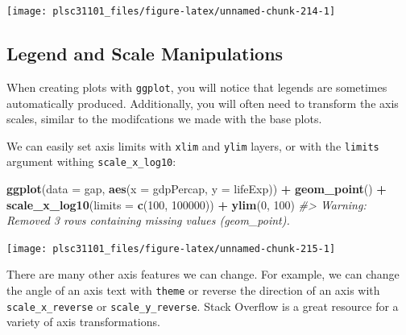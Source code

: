 \documentclass[
]{book}
\newenvironment{Shaded}{\begin{snugshade}}{\end{snugshade}}
\newcommand{\CommentTok}[1]{\textcolor[rgb]{0.56,0.35,0.01}{\textit{#1}}}
\newcommand{\DataTypeTok}[1]{\textcolor[rgb]{0.13,0.29,0.53}{#1}}
\newcommand{\DecValTok}[1]{\textcolor[rgb]{0.00,0.00,0.81}{#1}}
\newcommand{\KeywordTok}[1]{\textcolor[rgb]{0.13,0.29,0.53}{\textbf{#1}}}
\newcommand{\NormalTok}[1]{#1}
\newcommand{\OperatorTok}[1]{\textcolor[rgb]{0.81,0.36,0.00}{\textbf{#1}}}
\newcommand{\StringTok}[1]{\textcolor[rgb]{0.31,0.60,0.02}{#1}}
\begin{document}
\begin{center}\texttt{[image: plsc31101\_files/figure-latex/unnamed-chunk-214-1]} \end{center}

\hypertarget{legend-and-scale-manipulations}{%
\subsection{Legend and Scale Manipulations}\label{legend-and-scale-manipulations}}

When creating plots with \texttt{ggplot}, you will notice that legends are sometimes automatically produced. Additionally, you will often need to transform the axis scales, similar to the modifcations we made with the base plots.

We can easily set axis limits with \texttt{xlim} and \texttt{ylim} layers, or with the \texttt{limits} argument withing \texttt{scale\_x\_log10}:

\begin{Shaded}
\begin{Highlighting}[]
\KeywordTok{ggplot}\NormalTok{(}\DataTypeTok{data =}\NormalTok{ gap, }\KeywordTok{aes}\NormalTok{(}\DataTypeTok{x =}\NormalTok{ gdpPercap, }\DataTypeTok{y =}\NormalTok{ lifeExp)) }\OperatorTok{+}
\StringTok{  }\KeywordTok{geom_point}\NormalTok{() }\OperatorTok{+}\StringTok{ }
\StringTok{  }\KeywordTok{scale_x_log10}\NormalTok{(}\DataTypeTok{limits =} \KeywordTok{c}\NormalTok{(}\DecValTok{100}\NormalTok{, }\DecValTok{100000}\NormalTok{)) }\OperatorTok{+}
\StringTok{  }\KeywordTok{ylim}\NormalTok{(}\DecValTok{0}\NormalTok{, }\DecValTok{100}\NormalTok{)}
\CommentTok{#> Warning: Removed 3 rows containing missing values (geom_point).}
\end{Highlighting}
\end{Shaded}

\begin{center}\texttt{[image: plsc31101\_files/figure-latex/unnamed-chunk-215-1]} \end{center}

There are many other axis features we can change. For example, we can change the angle of an axis text with \texttt{theme} or reverse the direction of an axis with \texttt{scale\_x\_reverse} or \texttt{scale\_y\_reverse}. Stack Overflow is a great resource for a variety of axis transformations.
\end{document}
